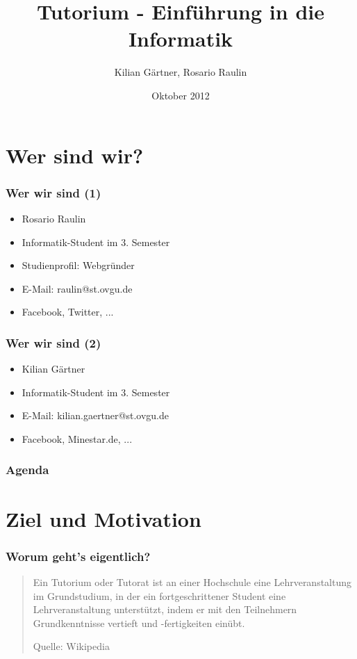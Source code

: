 \documentclass[12pt]{beamer}
\title{Tutorium - Einführung in die Informatik}
\author{Kilian Gärtner, Rosario Raulin}
\date{Oktober 2012}
\begin{document}
\frame{\titlepage}

\section{Wer sind wir?}

\begin{frame}

	\frametitle{Wer wir sind (1)}

	\begin{itemize}
		\item Rosario Raulin
		\item Informatik-Student im 3. Semester
		\item Studienprofil: Webgründer
		\item E-Mail: raulin@st.ovgu.de
		\item Facebook, Twitter, ...
	\end{itemize}

\end{frame}

\begin{frame}

	\frametitle{Wer wir sind (2)}

	\begin{itemize}
		\item Kilian Gärtner
		\item Informatik-Student im 3. Semester
		\item E-Mail: kilian.gaertner@st.ovgu.de
		\item Facebook, Minestar.de, ...
	\end{itemize}

\end{frame}

\begin{frame}
	\frametitle{Agenda}
	\tableofcontents
\end{frame}


\section{Ziel und Motivation}

\begin{frame}

\frametitle{Worum geht's eigentlich?}

	\begin{quote}
		Ein Tutorium oder Tutorat ist an einer Hochschule eine Lehrveranstaltung
		im Grundstudium, in der ein fortgeschrittener Student eine
		Lehrveranstaltung unterstützt, indem er mit den Teilnehmern
		Grundkenntnisse vertieft und -fertigkeiten einübt.

		\begin{flushright}
			\scriptsize Quelle: Wikipedia
		\end{flushright}

	\end{quote}
	
\end{frame}
\end{document}
